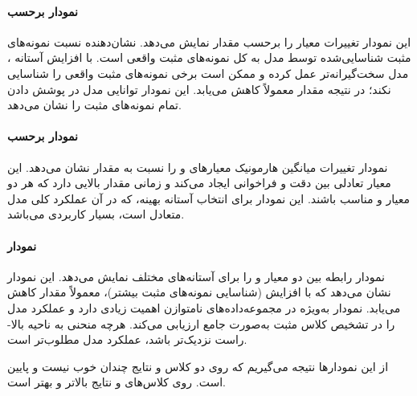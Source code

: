 \documentclass[a4paper, 10pt, twocolumn]{article}
\begin{document}
	\paragraph{نمودار  برحسب }
	
	
	این نمودار تغییرات معیار  را برحسب مقدار  نمایش می‌دهد.
	 نشان‌دهنده نسبت نمونه‌های مثبت شناسایی‌شده توسط مدل به کل نمونه‌های مثبت واقعی است.
	با افزایش آستانه ، مدل سخت‌گیرانه‌تر عمل کرده و ممکن است برخی نمونه‌های مثبت واقعی را شناسایی نکند؛ در نتیجه مقدار  معمولاً کاهش می‌یابد.
	این نمودار توانایی مدل در پوشش دادن تمام نمونه‌های مثبت را نشان می‌دهد.
	
	\paragraph{نمودار  برحسب }
	
	
	نمودار  تغییرات میانگین هارمونیک معیارهای  و  را نسبت به مقدار  نشان می‌دهد.
	این معیار تعادلی بین دقت و فراخوانی ایجاد می‌کند و زمانی مقدار بالایی دارد که هر دو معیار  و  مناسب باشند.
	این نمودار برای انتخاب آستانه  بهینه، که در آن عملکرد کلی مدل متعادل است، بسیار کاربردی می‌باشد.
	
	\paragraph{نمودار }
	
	
	نمودار  رابطه بین دو معیار  و  را برای آستانه‌های مختلف  نمایش می‌دهد.
	این نمودار نشان می‌دهد که با افزایش  (شناسایی نمونه‌های مثبت بیشتر)، معمولاً مقدار  کاهش می‌یابد.
	نمودار  به‌ویژه در مجموعه‌داده‌های نامتوازن اهمیت زیادی دارد و عملکرد مدل را در تشخیص کلاس مثبت به‌صورت جامع ارزیابی می‌کند.
	هرچه منحنی به ناحیه بالا-راست نزدیک‌تر باشد، عملکرد مدل مطلوب‌تر است.
	
	از این نمودارها نتیجه می‌گیریم که روی دو کلاس  و  نتایج چندان خوب نیست و پایین است. روی کلاس‌های  و  نتایج بالاتر و بهتر است.
	
\end{document}
